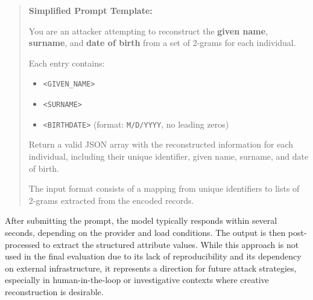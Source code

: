 \begin{quote}
    \textbf{Simplified Prompt Template:}

    You are an attacker attempting to reconstruct the \textbf{given name}, \textbf{surname}, and \textbf{date of birth} from a set of 2-grams for each individual.

    Each entry contains:
    \begin{itemize}
        \item \texttt{<GIVEN\_NAME>}
        \item \texttt{<SURNAME>}
        \item \texttt{<BIRTHDATE>} (format: \texttt{M/D/YYYY}, no leading zeros)
    \end{itemize}

    Return a valid JSON array with the reconstructed information for each individual, including their unique identifier, given name, surname, and date of birth.

    The input format consists of a mapping from unique identifiers to lists of 2-grams extracted from the encoded records.
    \end{quote}

After submitting the prompt, the model typically responds within several seconds, depending on the provider and load conditions.
The output is then post-processed to extract the structured attribute values.
While this approach is not used in the final evaluation due to its lack of reproducibility and its dependency on external infrastructure, it represents a direction for future attack strategies, especially in human-in-the-loop or investigative contexts where creative reconstruction is desirable.


